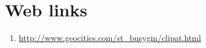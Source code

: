 \section*{Web links} 
\begin{enumerate}
   \item \href{http://www.geocities.com/st_busygin/clipat.html}
              {http://www.geocities.com/st\_busygin/clipat.html }
\end{enumerate}


